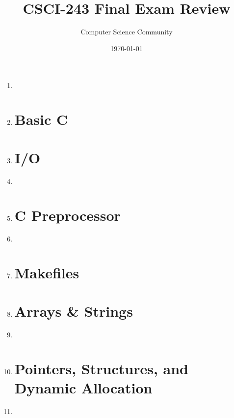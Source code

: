 \documentclass[11pt]{article}
\title{CSCI-243 Final Exam Review}
\author{Computer Science Community}
\date{\today}
\begin{document}
	\header 

	\begin{enumerate}
		\section*{History \& Language Paradigms}
		\item 
		
		\item 

		\section*{Basic C}
		\item 

		\section*{I/O}
		\item 

		\item 
			
		\section*{C Preprocessor}
		\item 

		\item 

		\section*{Makefiles}
		\item 

		\section*{Arrays \& Strings}
		\item 

		\item 

		\section*{Pointers, Structures, and Dynamic Allocation}
		\item 


\end{enumerate}
\end{document}
